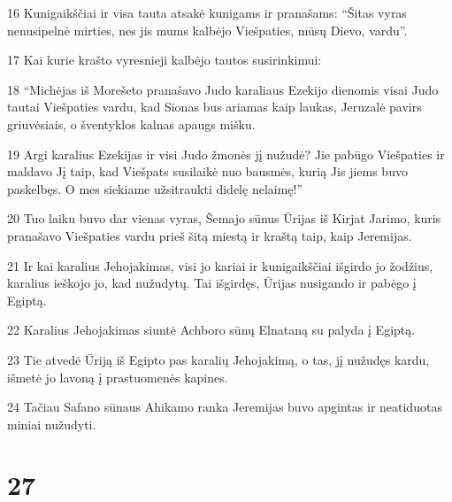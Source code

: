 \par 16 Kunigaikščiai ir visa tauta atsakė kunigams ir pranašams: “Šitas vyras nenusipelnė mirties, nes jis mums kalbėjo Viešpaties, mūsų Dievo, vardu”. 
\par 17 Kai kurie krašto vyresnieji kalbėjo tautos susirinkimui: 
\par 18 “Michėjas iš Morešeto pranašavo Judo karaliaus Ezekijo dienomis visai Judo tautai Viešpaties vardu, kad Sionas bus ariamas kaip laukas, Jeruzalė pavirs griuvėsiais, o šventyklos kalnas apaugs mišku. 
\par 19 Argi karalius Ezekijas ir visi Judo žmonės jį nužudė? Jie pabūgo Viešpaties ir maldavo Jį taip, kad Viešpats susilaikė nuo bausmės, kurią Jis jiems buvo paskelbęs. O mes siekiame užsitraukti didelę nelaimę!” 
\par 20 Tuo laiku buvo dar vienas vyras, Šemajo sūnus Ūrijas iš Kirjat Jarimo, kuris pranašavo Viešpaties vardu prieš šitą miestą ir kraštą taip, kaip Jeremijas. 
\par 21 Ir kai karalius Jehojakimas, visi jo kariai ir kunigaikščiai išgirdo jo žodžius, karalius ieškojo jo, kad nužudytų. Tai išgirdęs, Ūrijas nusigando ir pabėgo į Egiptą. 
\par 22 Karalius Jehojakimas siuntė Achboro sūnų Elnataną su palyda į Egiptą. 
\par 23 Tie atvedė Ūriją iš Egipto pas karalių Jehojakimą, o tas, jį nužudęs kardu, išmetė jo lavoną į prastuomenės kapines. 
\par 24 Tačiau Safano sūnaus Ahikamo ranka Jeremijas buvo apgintas ir neatiduotas miniai nužudyti.



\chapter{27}


